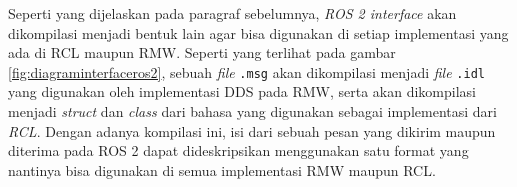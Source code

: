 Seperti yang dijelaskan pada paragraf sebelumnya,
  \emph{ROS 2 interface} akan dikompilasi menjadi bentuk lain agar bisa digunakan di setiap implementasi yang ada di RCL maupun RMW.
Seperti yang terlihat pada gambar \ref{fig:diagraminterfaceros2},
  sebuah \emph{file} \lstinline{.msg} akan dikompilasi menjadi \emph{file} \lstinline{.idl} yang digunakan oleh implementasi DDS pada RMW,
  serta akan dikompilasi menjadi \emph{struct} dan \emph{class} dari bahasa yang digunakan sebagai implementasi dari \emph{RCL}.
Dengan adanya kompilasi ini,
  isi dari sebuah pesan yang dikirim maupun diterima pada ROS 2 dapat dideskripsikan menggunakan satu format yang nantinya bisa digunakan di semua implementasi RMW maupun RCL.
